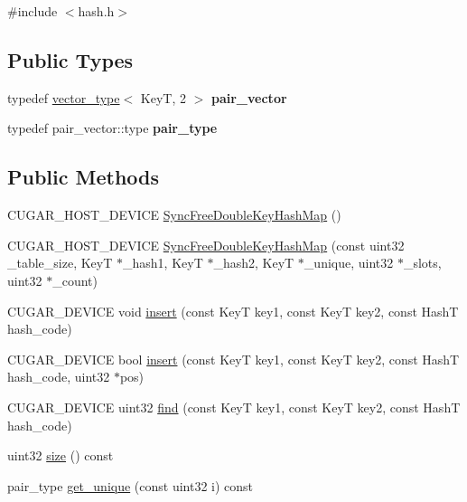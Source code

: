 {\ttfamily \#include $<$hash.\+h$>$}

\subsection*{Public Types}
\begin{DoxyCompactItemize}
\item 
\mbox{\label{structcugar_1_1cuda_1_1_sync_free_double_key_hash_map_a74e27af9352ff3c0f6bc8b473f4c340f}} 
typedef \hyperlink{structcugar_1_1vector__type}{vector\+\_\+type}$<$ KeyT, 2 $>$ {\bfseries pair\+\_\+vector}
\item 
\mbox{\label{structcugar_1_1cuda_1_1_sync_free_double_key_hash_map_aa4a6a6209000df8a5161e247feb87c45}} 
typedef pair\+\_\+vector\+::type {\bfseries pair\+\_\+type}
\end{DoxyCompactItemize}
\subsection*{Public Methods}
\begin{DoxyCompactItemize}
\item 
C\+U\+G\+A\+R\+\_\+\+H\+O\+S\+T\+\_\+\+D\+E\+V\+I\+CE \hyperlink{structcugar_1_1cuda_1_1_sync_free_double_key_hash_map_a88e47487525a8610eb264b37c87258a0}{Sync\+Free\+Double\+Key\+Hash\+Map} ()
\item 
C\+U\+G\+A\+R\+\_\+\+H\+O\+S\+T\+\_\+\+D\+E\+V\+I\+CE \hyperlink{structcugar_1_1cuda_1_1_sync_free_double_key_hash_map_af3ce3678b5fa703126da542b3d246047}{Sync\+Free\+Double\+Key\+Hash\+Map} (const uint32 \+\_\+table\+\_\+size, KeyT $\ast$\+\_\+hash1, KeyT $\ast$\+\_\+hash2, KeyT $\ast$\+\_\+unique, uint32 $\ast$\+\_\+slots, uint32 $\ast$\+\_\+count)
\item 
C\+U\+G\+A\+R\+\_\+\+D\+E\+V\+I\+CE void \hyperlink{structcugar_1_1cuda_1_1_sync_free_double_key_hash_map_aa271c313d2699e73a772d37c8bc8bfa9}{insert} (const KeyT key1, const KeyT key2, const HashT hash\+\_\+code)
\item 
C\+U\+G\+A\+R\+\_\+\+D\+E\+V\+I\+CE bool \hyperlink{structcugar_1_1cuda_1_1_sync_free_double_key_hash_map_aaec344d5d9f156a8d4a34ad19431aa8a}{insert} (const KeyT key1, const KeyT key2, const HashT hash\+\_\+code, uint32 $\ast$pos)
\item 
C\+U\+G\+A\+R\+\_\+\+D\+E\+V\+I\+CE uint32 \hyperlink{structcugar_1_1cuda_1_1_sync_free_double_key_hash_map_a279f94f0e11b195b974a74cf1b1c84ba}{find} (const KeyT key1, const KeyT key2, const HashT hash\+\_\+code)
\item 
uint32 \hyperlink{structcugar_1_1cuda_1_1_sync_free_double_key_hash_map_af48b50f724ede760119178bf1020ecea}{size} () const
\item 
pair\+\_\+type \hyperlink{structcugar_1_1cuda_1_1_sync_free_double_key_hash_map_a185a0df23df4a664e8d6f0582b8db16c}{get\+\_\+unique} (const uint32 i) const
\end{DoxyCompactItemize}
